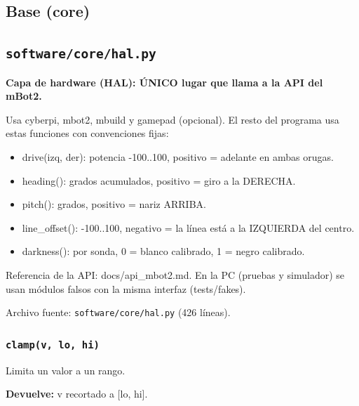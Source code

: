 \subsection*{Base (core)}
\subsection{\texttt{software/core/hal.py}}\label{mod:hal}
\textbf{Capa de hardware (HAL): ÚNICO lugar que llama a la API del mBot2.}

Usa cyberpi, mbot2, mbuild y gamepad (opcional). El resto del programa usa estas funciones con convenciones fijas:

\begin{itemize}\setlength\itemsep{0pt}
\item drive(izq, der): potencia -100..100, positivo = adelante en ambas orugas.
\item heading(): grados acumulados, positivo = giro a la DERECHA.
\item pitch(): grados, positivo = nariz ARRIBA.
\item line\_offset(): -100..100, negativo = la línea está a la IZQUIERDA del centro.
\item darkness(): por sonda, 0 = blanco calibrado, 1 = negro calibrado.
\end{itemize}
Referencia de la API: docs/api\_mbot2.md. En la PC (pruebas y simulador) se usan módulos falsos con la misma interfaz (tests/fakes).

\noindent Archivo fuente: \texttt{software/core/hal.py} (426 l\'ineas).

\subsubsection{\texttt{clamp(v, lo, hi)}}\label{fn:hal:clamp}
\noindent Limita un valor a un rango.

\par{}\par\smallskip
\noindent\textbf{Devuelve:} v recortado a [lo, hi].\par

